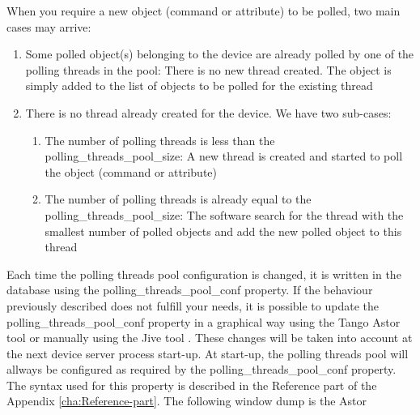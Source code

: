 When you require a new object (command or attribute) to be polled,
two main cases may arrive:
\begin{enumerate}
\item Some polled object(s) belonging to the device are already polled by
one of the polling threads in the pool: There is no new thread created.
The object is simply added to the list of objects to be polled for
the existing thread
\item There is no thread already created for the device. We have two sub-cases:

\begin{enumerate}
\item The number of polling threads is less than the polling\_threads\_pool\_size:
A new thread is created and started to poll the object (command or
attribute)
\item The number of polling threads is already equal to the polling\_threads\_pool\_size:
The software search for the thread with the smallest number of polled
objects and add the new polled object to this thread
\end{enumerate}
\end{enumerate}
Each time the polling threads pool configuration is changed, it is
written in the database using the polling\_threads\_pool\_conf property.
If the behaviour previously described does not fulfill your needs,
it is possible to update the polling\_threads\_pool\_conf property
in a graphical way using the Tango Astor \cite{Astor_doc} tool or
manually using the Jive tool \cite{Jive doc}. These changes will
be taken into account at the next device server process start-up.
At start-up, the polling threads pool will allways be configured as
required by the polling\_threads\_pool\_conf property. The syntax
used for this property is described in the Reference part of the Appendix
\ref{cha:Reference-part}. The following window dump is the Astor
